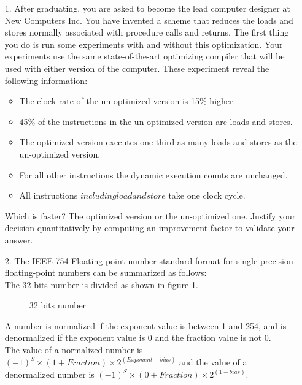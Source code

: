\documentclass[main.tex]{subfiles}
\begin{document}
\begin{enumerate}

\item[1.] After graduating, you are asked to become the lead computer designer at New Computers Inc. You have invented a scheme that reduces the loads and stores normally associated with procedure calls and returns. The first thing you do is run some experiments with and without this optimization. Your experiments use the same state-of-the-art optimizing compiler that will be used with either version of the computer. These experiment reveal the following information:
\begin{itemize}
    \item The clock rate of the un-optimized version is 15\% higher.
    \item 45\% of the instructions in the un-optimized version are loads and stores.
    \item The optimized version executes one-third as many loads and stores as the un-optimized version.
    \item For all other instructions the dynamic execution counts are unchanged.
    \item All instructions \(including load and store\) take one clock cycle.
\end{itemize}
Which is faster? The optimized version or the un-optimized one. Justify your decision quantitatively by computing an improvement factor to validate your answer.

\item[2.] The IEEE 754 Floating point number standard format for single precision floating-point numbers can be summarized as follows:\\

The 32 bits number is divided as shown in figure \ref{fig:f1}.

\begin{figure}
\centering{}
\caption{32 bits number}
\label{fig:f1}
\end{figure}

A number is normalized if the exponent value is between 1 and 254, and is denormalized if the exponent value is 0 and the fraction value is not 0.\\

The value of a normalized number is $(-1)^S \times (1+Fraction) \times 2^{(Exponent-bias)}$ and the value of a denormalized number is $(-1)^S \times (0+Fraction) \times 2^{(1-bias)}$.\\


\end{enumerate}
\end{document}
